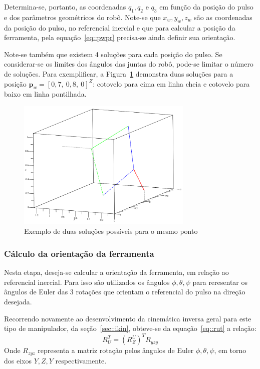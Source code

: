 %
Determina-se, portanto, as coordenadas $q_1, q_2$ e $q_3$ em função da posição
do pulso e dos parâmetros geométricos do robô.
Note-se que $x_w, y_w, z_w$ são as coordenadas da posição do pulso, no
referencial inercial e que para calcular a posição da ferramenta, pela
equação~\ref{eq::pwpr} precisa-se ainda definir sua orientação.

Note-se também que existem 4 soluções para cada posição do pulso. Se
considerar-se os limites dos ângulos das juntas do robô, pode-se limitar o
número de soluções. Para exemplificar, a Figura~\ref{fig::elbowupdown} demonstra
duas soluções para a posição $\mathbf{p}_{w} = [0,7,~ 0,8,~ 0]^Z$: cotovelo para
cima em linha cheia e cotovelo para baixo em linha pontilhada.

\begin{figure}[h]
	\centering 
 	\includegraphics[width=0.75\textwidth]{figs/elbowupdown}
 	\caption{Exemplo de duas soluções possíveis para o mesmo ponto}
 	\label{fig::elbowupdown}
\end{figure}


\subsubsection{Cálculo da orientação da ferramenta}

Nesta etapa, deseja-se calcular a orientação da ferramenta, em relação ao
referencial inercial. Para isso são utilizados os ângulos $\phi,\theta,\psi$
para reresentar os ângulos de Euler das 3 rotações que orientam o referencial do
pulso na direção desejada.

Recorrendo novamente ao desenvolvimento da cinemática inversa geral para este
tipo de manipulador, da seção~\ref{sec::ikin}, obteve-se da
equação~\ref{eq::rut} a relação:
%
\begin{equation*}
	R_{U}^{T} = (R_{Z}^{U})^T R_{yzy}
\end{equation*}
%
Onde $R_{zyz}$ representa a matriz rotação pelos ângulos de Euler
$\phi,\theta,\psi$, em torno dos eixos $Y,Z,Y$ respectivamente.

